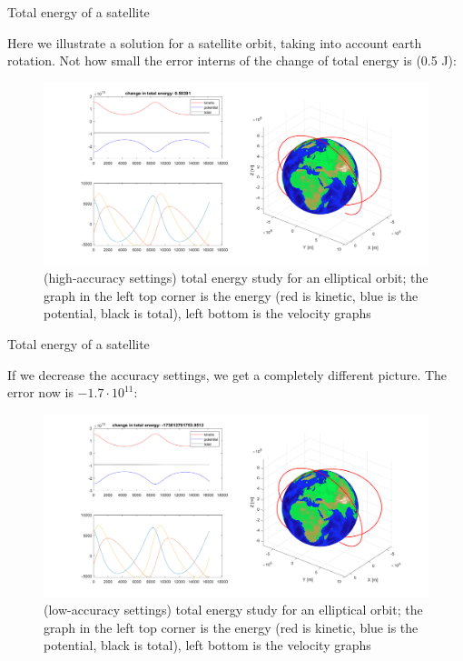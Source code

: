 \documentclass{beamer}
\begin{document}
\begin{frame}{Total energy of a satellite}
	\begin{flushleft}
		
		Here we illustrate a solution for a satellite orbit, taking into account earth rotation. Not how small the error interns of the change of total energy is (0.5 J):
		
		\begin{figure}
			\centering
			\includegraphics[width=0.7\linewidth]{Energy}
			\caption{(high-accuracy settings) total energy study for an elliptical orbit; the graph in the left top corner is the energy (red is kinetic, blue is the potential, black is total), left bottom is the velocity graphs}
			\label{fig:energy}
		\end{figure}
		
		
	\end{flushleft}
\end{frame}




\begin{frame}{Total energy of a satellite}
	\begin{flushleft}
		
		If we decrease the accuracy settings, we get a completely different picture. The error now is $-1.7 \cdot 10^{11}$:
		
		\begin{figure}
			\centering
			\includegraphics[width=0.7\linewidth]{Energy_high_error}
			\caption{(low-accuracy settings) total energy study for an elliptical orbit; the graph in the left top corner is the energy (red is kinetic, blue is the potential, black is total), left bottom is the velocity graphs}
			\label{fig:energy}
		\end{figure}
		
		
	\end{flushleft}
\end{frame}
\end{document}
